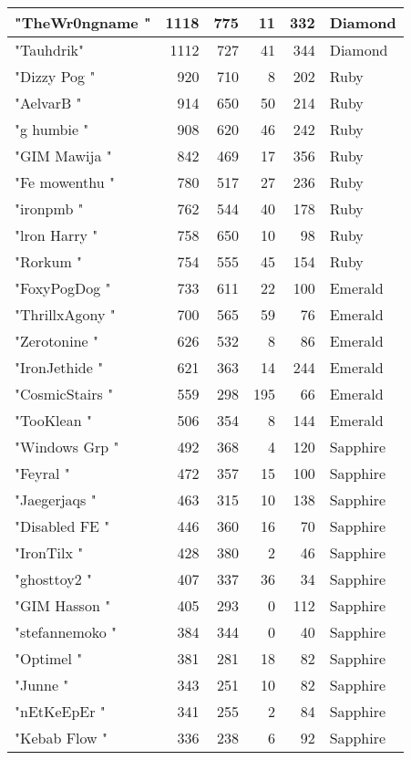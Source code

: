 \documentclass{article}
\begin{document}
\begin{table}[htbp]
\begin{tabular}{|l|r|r|r|r|l|}
"TheWr0ngname " & 1118 & 775 & 11 & 332 & Diamond \\ \hline
"Tauhdrik" & 1112 & 727 & 41 & 344 & Diamond \\ \hline
"Dizzy Pog " & 920 & 710 & 8 & 202 & Ruby \\ \hline
"AelvarB " & 914 & 650 & 50 & 214 & Ruby \\ \hline
"g humbie " & 908 & 620 & 46 & 242 & Ruby \\ \hline
"GIM Mawija " & 842 & 469 & 17 & 356 & Ruby \\ \hline
"Fe mowenthu " & 780 & 517 & 27 & 236 & Ruby \\ \hline
"ironpmb " & 762 & 544 & 40 & 178 & Ruby \\ \hline
"lron Harry " & 758 & 650 & 10 & 98 & Ruby \\ \hline
"Rorkum " & 754 & 555 & 45 & 154 & Ruby \\ \hline
"FoxyPogDog " & 733 & 611 & 22 & 100 & Emerald \\ \hline
"ThrillxAgony " & 700 & 565 & 59 & 76 & Emerald \\ \hline
"Zerotonine " & 626 & 532 & 8 & 86 & Emerald \\ \hline
"IronJethide " & 621 & 363 & 14 & 244 & Emerald \\ \hline
"CosmicStairs " & 559 & 298 & 195 & 66 & Emerald \\ \hline
"TooKlean " & 506 & 354 & 8 & 144 & Emerald \\ \hline
"Windows Grp " & 492 & 368 & 4 & 120 & Sapphire \\ \hline
"Feyral " & 472 & 357 & 15 & 100 & Sapphire \\ \hline
"Jaegerjaqs " & 463 & 315 & 10 & 138 & Sapphire \\ \hline
"Disabled FE " & 446 & 360 & 16 & 70 & Sapphire \\ \hline
"IronTilx " & 428 & 380 & 2 & 46 & Sapphire \\ \hline
"ghosttoy2 " & 407 & 337 & 36 & 34 & Sapphire \\ \hline
"GIM Hasson " & 405 & 293 & 0 & 112 & Sapphire \\ \hline
"stefannemoko " & 384 & 344 & 0 & 40 & Sapphire \\ \hline
"Optimel " & 381 & 281 & 18 & 82 & Sapphire \\ \hline
"Junne " & 343 & 251 & 10 & 82 & Sapphire \\ \hline
"nEtKeEpEr " & 341 & 255 & 2 & 84 & Sapphire \\ \hline
"Kebab Flow " & 336 & 238 & 6 & 92 & Sapphire \\ \hline

\end{tabular}
\end{table}
\end{document}
